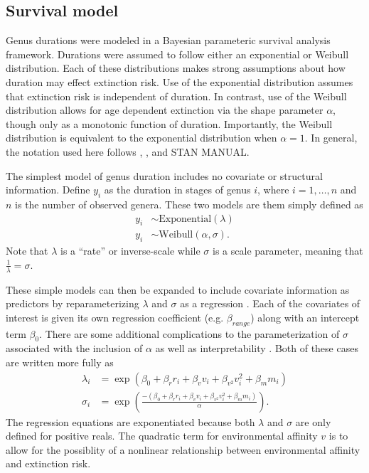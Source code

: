 \documentclass[12pt,letterpaper]{article}
\begin{document}
\subsection{Survival model}

Genus durations were modeled in a Bayesian parameteric survival analysis framework. Durations were assumed to follow either an exponential or Weibull distribution. Each of these distributions makes strong assumptions about how duration may effect extinction risk. Use of the exponential distribution assumes that extinction risk is independent of duration. In contrast, use of the Weibull distribution allows for age dependent extinction via the shape parameter \(\alpha\), though only as a monotonic function of duration. Importantly, the Weibull distribution is equivalent to the exponential distribution when \(\alpha = 1\). In general, the notation used here follows \citet{Gelman2007}, \citet{Gelman2013d}, and \uppercase{stan manual}.

The simplest model of genus duration includes no covariate or structural information. Define \(y_{i}\) as the duration in stages of genus \(i\), where \(i = 1, \dots, n\) and \(n\) is the number of observed genera. These two models are them simply defined as
\begin{equation}
  \begin{aligned}
    y_{i} &\sim \mathrm{Exponential}(\lambda) \\
    y_{i} &\sim \mathrm{Weibull}(\alpha, \sigma).
  \end{aligned}
  \label{eq:simple}
\end{equation}
Note that \(\lambda\) is a ``rate'' or inverse-scale while \(\sigma\) is a scale parameter, meaning that \(\frac{1}{\lambda} = \sigma\).

These simple models can then be expanded to include covariate information as predictors by reparameterizing \(\lambda\) and \(\sigma\) as a regression \citep{Klein2003}. Each of the covariates of interest is given its own regression coefficient (e.g. \(\beta_{range}\)) along with an intercept term \(\beta_{0}\). There are some additional complications to the parameterization of \(\sigma\) associated with the inclusion of \(\alpha\) as well as interpretability \citep{Klein2003}. Both of these cases are written more fully as
\begin{equation}
  \begin{aligned}
    \lambda_{i} &= \exp(\beta_{0} + \beta_{r} r_{i} + \beta_{v} v_{i} + \beta_{v^{2}} v_{i}^{2} + \beta_{m} m_{i}) \\
    \sigma_{i} &= \exp\left(\frac{-(\beta_{0} + \beta_{r} r_{i} + \beta_{v} v_{i} + \beta_{v^{2}} v_{i}^{2} + \beta_{m} m_{i})}{\alpha}\right).
  \end{aligned}
  \label{eq:regression}
\end{equation}
The regression equations are exponentiated because both \(\lambda\) and \(\sigma\) are only defined for positive reals. The quadratic term for environmental affinity \(v\) is to allow for the possiblity of a nonlinear relationship between environmental affinity and extinction risk.
\end{document}
